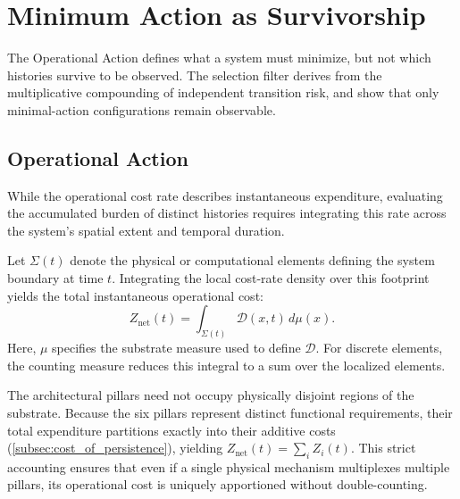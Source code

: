 \newpage



\section{Minimum Action as Survivorship}
\label{sec:minimum_action}
The Operational Action defines what a system must minimize, but not which histories survive to be observed. The selection filter derives from the multiplicative compounding of independent transition risk, and show that only minimal-action configurations remain observable.


\subsection{Operational Action}
\label{subsec:operational_action}

While the operational cost rate describes instantaneous expenditure, evaluating the accumulated burden of distinct histories requires integrating this rate across the system's spatial extent and temporal duration.

Let $\Sigma(t)$ denote the physical or computational elements defining the system boundary at time $t$. Integrating the local cost-rate density over this footprint yields the total instantaneous operational cost:
\begin{equation}
\label{eq:impedance_density}
    Z_{\mathrm{net}}(t)
    = \int_{\Sigma(t)} \mathcal{D}(x,t)\,d\mu(x).
\end{equation}
Here, $\mu$ specifies the substrate measure used to define $\mathcal{D}$. For discrete elements, the counting measure reduces this integral to a sum over the localized elements.

The architectural pillars need not occupy physically disjoint regions of the substrate. Because the six pillars represent distinct functional requirements, their total expenditure partitions exactly into their additive costs (\cref{subsec:cost_of_persistence}), yielding $Z_{\mathrm{net}}(t)=\sum_i Z_i(t)$. This strict accounting ensures that even if a single physical mechanism multiplexes multiple pillars, its operational cost is uniquely apportioned without double-counting.

